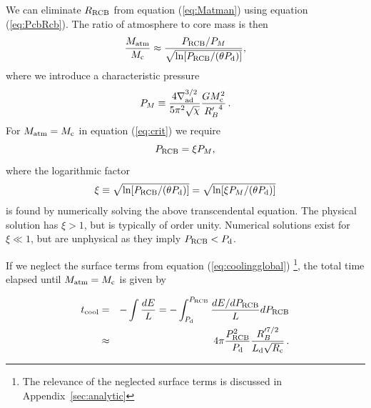 \documentclass[apj]{emulateapj}
\newcommand{\delad}{\nabla_{\rm ad}}
\newcommand{\Eq}[1]{equation\,(\ref{#1})}
\newcommand{\App}[1]{Appendix~\ref{#1}}
\newcommand{\co}{_{\rm c}}
\newcommand{\di}{_{\rm d}}
\newcommand{\cb}{_{\rm RCB}}
\begin{document}
We can eliminate $R\cb$ from equation (\ref{eq:Matman}) using \Eq{eq:PcbRcb}.  The ratio of atmosphere to core mass is then  
\begin{equation} \label{eq:crit}
{M_{\rm atm} \over M\co} \approx {P\cb /P_M \over  \sqrt{\ln[ P\cb/(\theta P_{\rm d})]}},
\end{equation} 
where we introduce a characteristic pressure
\begin{equation} 
P_M \equiv {4 \delad^{3/2} \over 5 \pi^2 \sqrt{\chi} } {G M\co^2 \over {R_B'}^4}\, .
\end{equation} 
For $M_{\rm atm} = M\co$ in equation (\ref{eq:crit}) we require
\begin{equation} \label{eq:Pcbc}
P\cb = \xi P_M ,
\end{equation} 
where  the logarithmic factor
\begin{equation}\label{eq:xi}
\xi \equiv \sqrt{\ln[ P\cb/(\theta P_{\rm d})]} = \sqrt{\ln[ \xi P_M / (\theta P_{\rm d})]}
\end{equation} 
is found by numerically solving the above transcendental equation. The physical solution has $\xi >1$, but is typically of order unity. Numerical solutions exist for $\xi \ll 1$, but are unphysical as they imply $P\cb < P_{\rm d}$.

If we neglect the surface terms from equation (\ref{eq:coolingglobal}) \footnote{The relevance of the neglected surface terms is discussed in \App{sec:analytic}}, the total time elapsed until $M_{\rm{atm}}= M\co$ is given by

\begin{eqnarray} 
t_{\rm  cool} &=& -\int {d E \over L} = - \int_{P\di}^{P\cb } {d E/d P\cb \over L} dP\cb \\
&\approx& 4 \pi {P\cb^{2} \over P\di} {R_B'^{7/2} \over L\di \sqrt{R\co}} \label{eq:tcool}\, .
\end{eqnarray} 
\end{document}
